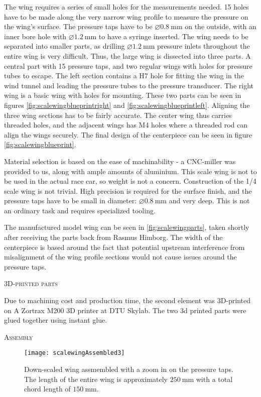       The wing requires a series of small holes for the measurements needed. 15 holes have to be made along the very narrow wing profile to measure the pressure on the wing's surface. The pressure taps have to be $\diameter\SI{0.8}{\milli\metre}$ on the outside, with an inner bore hole with $\diameter\SI{1.2}{\milli\metre}$ to have a syringe inserted. The wing needs to be separated into smaller parts, as drilling $\diameter\SI{1.2}{\milli\metre}$ pressure inlets throughout the entire wing is very difficult. Thus, the large wing is dissected into three parts. A central part with 15 pressure taps, and two regular wings with holes for pressure tubes to escape. The left section contains a H7 hole for fitting the wing in the wind tunnel and leading the pressure tubes to the pressure transducer. The right wing is a basic wing with holes for mounting. These two parts can be seen in figures \ref{fig:scalewingblueprintright} and \ref{fig:scalewingblueprintleft}. Aligning the three wing sections has to be fairly accurate. The center wing thus carries threaded holes, and the adjacent wings has M4 holes where a threaded rod can align the wings securely. The final design of the centerpiece can be seen in figure \ref{fig:scalewingblueprint}.

      Material selection is based on the ease of machinability - a CNC-miller was provided to us, along with ample amounts of aluminium. This scale wing is not to be used in the actual race car, so weight is not a concern. Construction of the 1/4 scale wing is not trivial. High precision is required for the surface finish, and the pressure taps have to be small in diameter: $\diameter\SI{0.8}{\milli\metre}$ and very deep. This is not an ordinary task and requires specialized tooling.

      The manufactured model wing can be seen in \ref{fig:scalewingparts}, taken shortly after receiving the parts back from Rasmus Himborg. The width of the centerpiece is based around the fact that potential upstream interference from misalignment of the wing profile sections would not cause issues around the pressure taps. %

      \textsc{3D-printed parts}

        Due to machining cost and production time, the second element was 3D-printed on A Zortrax M200 3D printer at DTU Skylab. The two 3d printed parts were glued together using instant glue.

      \textsc{Assembly}

      \begin{figure}
        \texttt{[image: scalewingAssembled3]}
        \caption{Down-scaled wing assmembled with a zoom in on the pressure taps. The length of the entire wing is approximately $\SI{250}{\milli\metre}$ with a total chord length of $\SI{150}{\milli\metre}$.}
        \label{fig:scalewing}
      \end{figure}


